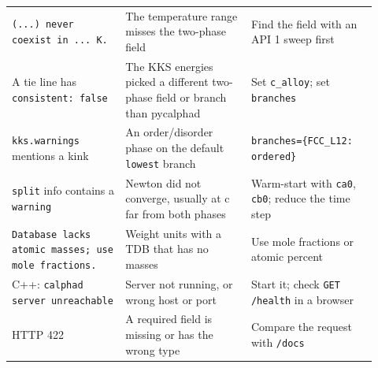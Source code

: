 \documentclass[12pt,a4paper]{article}
\begin{document}
\begin{longtable}{>{\raggedright\arraybackslash}p{0.287\linewidth}>{\raggedright\arraybackslash}p{0.319\linewidth}>{\raggedright\arraybackslash}p{0.315\linewidth}}
\texttt{(.\allowbreak{}.\allowbreak{}.\allowbreak{}) never coexist in .\allowbreak{}.\allowbreak{}.\allowbreak{} K.\allowbreak{}} & The temperature range misses the two-phase field & Find the field with an API 1 sweep first \\
A tie line has \texttt{consistent: false} & The KKS energies picked a different two-phase field or branch than pycalphad & Set \texttt{c\_\allowbreak{}alloy}; set \texttt{branches} \\
\texttt{kks.\allowbreak{}warnings} mentions a kink & An order/disorder phase on the default \texttt{\textquotedbl{}lowest\textquotedbl{}} branch & \texttt{branches=\{\textquotedbl{}FCC\_\allowbreak{}L12\textquotedbl{}: \textquotedbl{}ordered\textquotedbl{}\}} \\
\texttt{split} info contains a \texttt{warning} & Newton did not converge, usually at c far from both phases & Warm-start with \texttt{ca0}, \texttt{cb0}; reduce the time step \\
\texttt{Database lacks atomic masses; use mole fractions.\allowbreak{}} & Weight units with a TDB that has no masses & Use mole fractions or atomic percent \\
C++: \texttt{calphad server unreachable} & Server not running, or wrong host or port & Start it; check \texttt{GET /\allowbreak{}health} in a browser \\
HTTP 422 & A required field is missing or has the wrong type & Compare the request with \texttt{/\allowbreak{}docs} \\
\bottomrule
\end{longtable}
\endgroup

\end{document}
